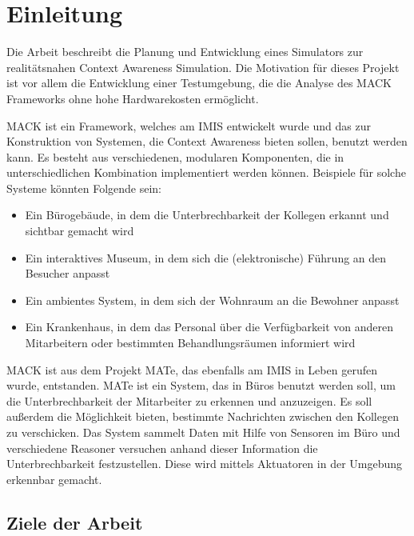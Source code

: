 \chapter{Einleitung}\label{chapter:introduction}


Die Arbeit beschreibt die Planung und Entwicklung eines Simulators zur realitätsnahen Context Awareness Simulation. Die Motivation für dieses Projekt ist vor allem die Entwicklung einer Testumgebung, die die Analyse des MACK Frameworks ohne hohe Hardwarekosten ermöglicht.

MACK ist ein Framework, welches am IMIS entwickelt wurde und das zur Konstruktion von Systemen, die Context Awareness bieten sollen, benutzt werden kann. Es besteht aus verschiedenen, modularen Komponenten, die in unterschiedlichen Kombination implementiert werden können. Beispiele für solche Systeme könnten Folgende sein:
\begin{itemize}

\item Ein Bürogebäude, in dem die Unterbrechbarkeit der Kollegen erkannt und sichtbar gemacht wird
\item Ein interaktives Museum, in dem sich die (elektronische) Führung an den Besucher anpasst
\item Ein ambientes System, in dem sich der Wohnraum an die Bewohner anpasst
\item Ein Krankenhaus, in dem das Personal über die Verfügbarkeit von anderen Mitarbeitern oder bestimmten Behandlungsräumen informiert wird

\end{itemize}

MACK ist aus dem Projekt MATe, das ebenfalls am IMIS in Leben gerufen wurde, entstanden. MATe ist ein System, das in Büros benutzt werden soll, um die Unterbrechbarkeit der Mitarbeiter zu erkennen und anzuzeigen. Es soll außerdem die Möglichkeit bieten, bestimmte Nachrichten zwischen den Kollegen zu verschicken. Das System sammelt Daten mit Hilfe von Sensoren im Büro und verschiedene Reasoner versuchen anhand dieser Information die Unterbrechbarkeit festzustellen. Diese wird mittels Aktuatoren in der Umgebung erkennbar gemacht.

\section{Ziele der Arbeit}\label{sec:goals}

